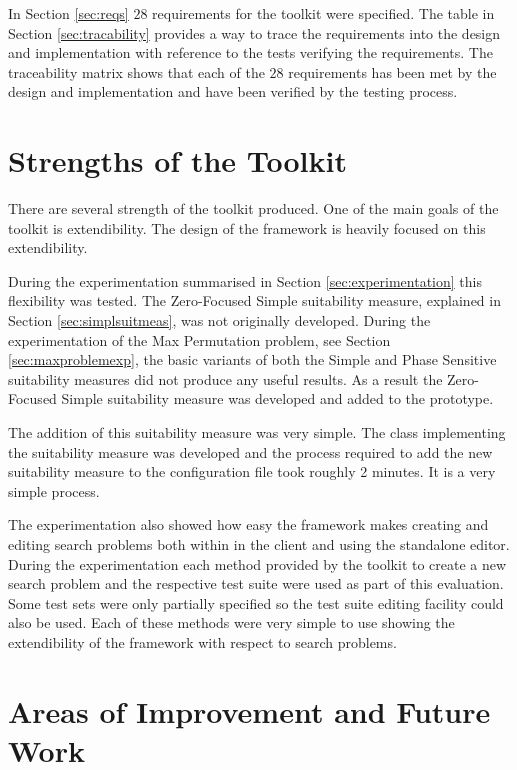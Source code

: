 In Section \ref{sec:reqs} $28$ requirements for the toolkit were specified.
The table in Section \ref{sec:tracability} provides a way to trace the requirements into the design and implementation with reference to the tests verifying the requirements.
The traceability matrix shows that each of the $28$ requirements has been met by the design and implementation and have been verified by the testing process.

\section{Strengths of the Toolkit}

There are several strength of the toolkit produced.
One of the main goals of the toolkit is extendibility.
The design of the framework is heavily focused on this extendibility.

During the experimentation summarised in Section \ref{sec:experimentation} this flexibility was tested.
The Zero-Focused Simple suitability measure, explained in Section \ref{sec:simplsuitmeas}, was not originally developed.
During the experimentation of the Max Permutation problem, see Section \ref{sec:maxproblemexp}, the basic variants of both the Simple and Phase Sensitive suitability measures did not produce any useful results.
As a result the Zero-Focused Simple suitability measure was developed and added to the prototype.

The addition of this suitability measure was very simple.
The class implementing the suitability measure was developed and the process required to add the new suitability measure to the configuration file took roughly 2 minutes.
It is a very simple process.

The experimentation also showed how easy the framework makes creating and editing search problems both within in the client and using the standalone editor.
During the experimentation each method provided by the toolkit to create a new search problem and the respective test suite were used as part of this evaluation.
Some test sets were only partially specified so the test suite editing facility could also be used.
Each of these methods were very simple to use showing the extendibility of the framework with respect to search problems.

\section{Areas of Improvement and Future Work}

